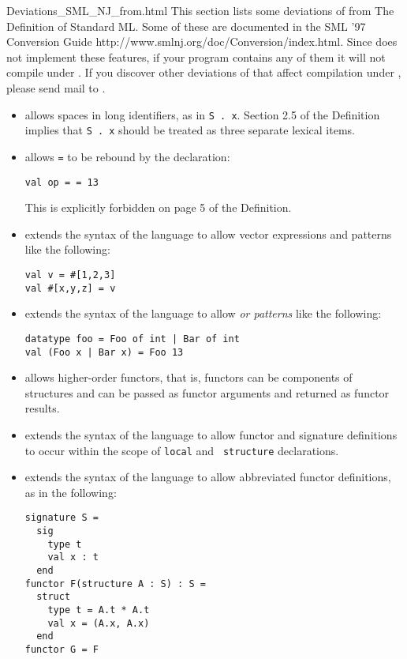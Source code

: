     {Deviations_SML_NJ_from.html}
%
This section lists some deviations of {\smlnj} from The Definition of
Standard ML.  Some of these are documented in the 
\htmladdnormallink
  {SML '97 Conversion Guide}
  {http://www.smlnj.org/doc/Conversion/index.html}.
Since {\mlton} does not implement these features, if your program
contains any of them it will not compile under {\mlton}.  If you discover
other deviations of {\smlnj} that affect compilation under {\mlton},
please send mail to {\mltonmail}.

\begin{itemize}
\item
{\smlnj} allows spaces in long identifiers, as in {\tt S . x}.
Section 2.5 of the Definition implies that {\tt S . x} should be
treated as three separate lexical items.

\item
{\smlnj} allows {\tt =} to be rebound by the declaration:
\begin{verbatim}
val op = = 13
\end{verbatim}
This is explicitly forbidden on page 5 of the Definition.

\item
{\smlnj} extends the syntax of the language to allow
vector expressions and patterns like the following:
\begin{verbatim}
val v = #[1,2,3]
val #[x,y,z] = v
\end{verbatim}
%
\item 
{\smlnj} extends the syntax of the language to allow {\em or patterns}
like the following:
\begin{verbatim}
datatype foo = Foo of int | Bar of int
val (Foo x | Bar x) = Foo 13
\end{verbatim}
%
\item
{\smlnj} allows higher-order functors, that is, functors can be
components of structures and can be passed as functor arguments and
returned as functor results. 

\item
{\smlnj} extends the syntax of the language to allow functor and
signature definitions to occur within the scope of {\tt local} and {\tt
structure} declarations.

\item
{\smlnj} extends the syntax of the language to allow abbreviated
functor definitions, as in the following:
\begin{verbatim}
signature S =
  sig
    type t
    val x : t
  end
functor F(structure A : S) : S = 
  struct
    type t = A.t * A.t
    val x = (A.x, A.x)
  end
functor G = F
\end{verbatim} 


\end{itemize}
